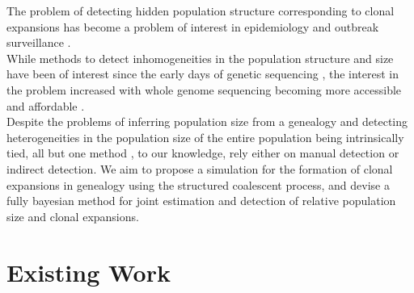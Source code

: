 \documentclass{report}
\theoremstyle{definition}
\begin{document}
The problem of detecting hidden population structure corresponding to clonal expansions has become a problem of interest in epidemiology and outbreak surveillance \cite{volz_identification_nodate}.\\
While methods to detect inhomogeneities in the population structure and size have been of interest since the early days of genetic sequencing \cite{smith_how_1993,spratt_displaying_2004}, the interest in the problem increased with whole genome sequencing becoming more accessible and affordable \cite{holden_genomic_2013,dearlove_measuring_2015,eldholm_four_2015}.\\
Despite the problems of inferring population size from a genealogy and detecting heterogeneities in the population size of the entire population being intrinsically tied, all but one method \cite{volz_identification_nodate}, to our knowledge, rely either on manual detection or indirect detection. We aim to propose a simulation for the formation of clonal expansions in genealogy using the structured coalescent process, and devise a fully bayesian method for joint estimation and detection of relative population size and clonal expansions.
\section{Existing Work}
\end{document}
